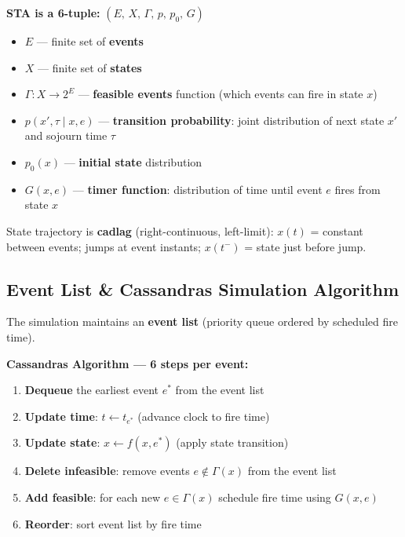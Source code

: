 \documentclass[10pt,a4paper]{article}
\begin{document}
\begin{defbox}
\textbf{STA is a 6-tuple:} $(E,\, X,\, \Gamma,\, p,\, p_0,\, G)$
\begin{itemize}
  \item $E$ --- finite set of \textbf{events}
  \item $X$ --- finite set of \textbf{states}
  \item $\Gamma: X \to 2^E$ --- \textbf{feasible events} function (which events can fire in state $x$)
  \item $p(x', \tau \mid x, e)$ --- \textbf{transition probability}: joint distribution of next state $x'$ and sojourn time $\tau$
  \item $p_0(x)$ --- \textbf{initial state} distribution
  \item $G(x, e)$ --- \textbf{timer function}: distribution of time until event $e$ fires from state $x$
\end{itemize}
\end{defbox}

\begin{notebox}
State trajectory is \textbf{cadlag} (right-continuous, left-limit):
$x(t)$ = constant between events; jumps at event instants; $x(t^-)$ = state just before jump.
\end{notebox}

\subsection*{Event List \& Cassandras Simulation Algorithm}

The simulation maintains an \textbf{event list} (priority queue ordered by scheduled fire time).

\begin{keybox}
\textbf{Cassandras Algorithm --- 6 steps per event:}
\begin{enumerate}
  \item \textbf{Dequeue} the earliest event $e^*$ from the event list
  \item \textbf{Update time}: $t \leftarrow t_{e^*}$ (advance clock to fire time)
  \item \textbf{Update state}: $x \leftarrow f(x, e^*)$ (apply state transition)
  \item \textbf{Delete infeasible}: remove events $e \notin \Gamma(x)$ from the event list
  \item \textbf{Add feasible}: for each new $e \in \Gamma(x)$ schedule fire time using $G(x, e)$
  \item \textbf{Reorder}: sort event list by fire time
\end{enumerate}
\end{keybox}
\end{document}
